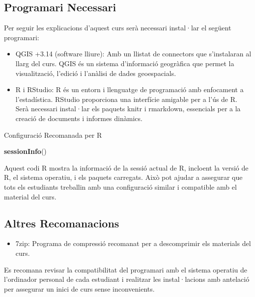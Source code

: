 \documentclass[
]{book}
\newenvironment{Shaded}{\begin{snugshade}}{\end{snugshade}}
\newcommand{\KeywordTok}[1]{\textcolor[rgb]{0.13,0.29,0.53}{\textbf{#1}}}
\newcommand{\NormalTok}[1]{#1}
\providecommand{\tightlist}{%
  \setlength{\itemsep}{0pt}\setlength{\parskip}{0pt}}
\begin{document}
\hypertarget{programari-necessari}{%
\subsection*{Programari Necessari}\label{programari-necessari}}

Per seguir les explicacions d'aquest curs serà necessari instal·lar el següent programari:

\begin{itemize}
\tightlist
\item
  QGIS +3.14 (software lliure): Amb un llistat de connectors que s'instalaran al llarg del curs. QGIS és un sistema d'informació geogràfica que permet la visualització, l'edició i l'anàlisi de dades geoespacials.
\item
  R i RStudio: R és un entorn i llenguatge de programació amb enfocament a l'estadística. RStudio proporciona una interfície amigable per a l'ús de R. Serà necessari instal·lar els paquets knitr i rmarkdown, essencials per a la creació de documents i informes dinàmics.
\end{itemize}

Configuració Recomanada per R

\begin{Shaded}
\begin{Highlighting}[]
\KeywordTok{sessionInfo}\NormalTok{()}
\end{Highlighting}
\end{Shaded}

Aquest codi R mostra la informació de la sessió actual de R, incloent la versió de R, el sistema operatiu, i els paquets carregats. Això pot ajudar a assegurar que tots els estudiants treballin amb una configuració similar i compatible amb el material del curs.

\hypertarget{altres-recomanacions}{%
\subsection*{Altres Recomanacions}\label{altres-recomanacions}}

\begin{itemize}
\tightlist
\item
  7zip: Programa de compressió recomanat per a descomprimir els materials del curs.
\end{itemize}

Es recomana revisar la compatibilitat del programari amb el sistema operatiu de l'ordinador personal de cada estudiant i realitzar les instal·lacions amb antelació per assegurar un inici de curs sense inconvenients.
\end{document}
